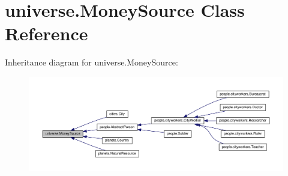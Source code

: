 \hypertarget{classuniverse_1_1_money_source}{}\section{universe.\+Money\+Source Class Reference}
\label{classuniverse_1_1_money_source}


Inheritance diagram for universe.\+Money\+Source\+:\nopagebreak
\begin{figure}[H]
\begin{center}
\leavevmode
\includegraphics[width=350pt]{classuniverse_1_1_money_source__inherit__graph}
\end{center}
\end{figure}
